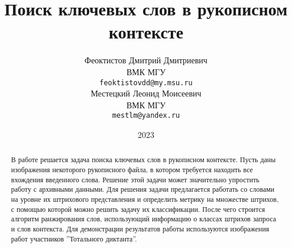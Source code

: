 \documentclass{article}
\title{Поиск ключевых слов в рукописном контексте}
\author{ Феоктистов Дмитрий Дмитриевич \\
	ВМК МГУ\\
	\texttt{feoktistovdd@my.msu.ru} \\
	\And
	Местецкий Леонид Моисеевич \\
	ВМК МГУ\\
	\texttt{mestlm@yandex.ru} \\
}
\date{2023}
\begin{document}
\maketitle

\begin{abstract}
	В работе решается задача поиска ключевых слов в рукописном контексте. Пусть даны изображения некоторого рукописного файла, в котором требуется находить все вхождения введенного слова. Решение этой задачи может значительно упростить работу с архивными данными. Для решения задачи предлагается работать со словами на уровне их штрихового представления и определить метрику на множестве штрихов, с помощью которой можно решить задачу их классификации. После чего строится алгоритм ранжирования слов, использующий информацию о классах штрихов запроса и слов контекста. Для демонстрации результатов работы используются изображения работ участников ''Тотального диктанта''.
\end{abstract}







\end{document}
